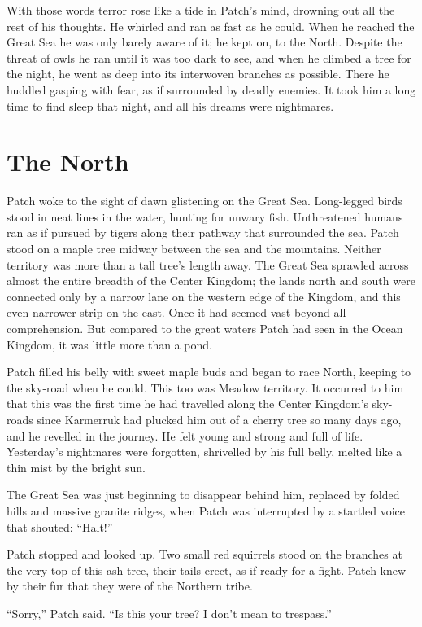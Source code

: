 \documentclass[ebook,oneside,openany,17pt]{memoir}
\newenvironment{tolerant}[1]{%
  \par\tolerance=#1\relax
}{%
  \par
}
\renewcommand{\thechapter}{\Roman{chapter}}
\newcounter{sections}
\newcommand{\sections}[1]{%
  \section*{#1}
  \addtocounter{sections}{1}%
  \pdfbookmark[1]{#1}{section.\thechapter.\thesections}}
\begin{document}
With those words terror rose like a tide in Patch’s mind, drowning out
all the rest of his thoughts. He whirled and ran as fast as he
could. When he reached the Great Sea he was only barely aware of it;
he kept on, to the North. Despite the threat of owls he ran until it
was too dark to see, and when he climbed a tree for the night, he went
as deep into its interwoven branches as possible. There he huddled
gasping with fear, as if surrounded by deadly enemies. It took him a
long time to find sleep that night, and all his dreams were
nightmares.


\sections{The North}

Patch woke to the sight of dawn glistening on the Great
Sea. Long-legged birds stood in neat lines in the water, hunting for
unwary fish. Unthreatened humans ran as if pursued by tigers along
their pathway that surrounded the sea. Patch stood on a maple tree
midway between the sea and the mountains. Neither territory was more
than a tall tree’s length away. The Great Sea sprawled across almost
the entire breadth of the Center Kingdom; the lands north and south
were connected only by a narrow lane on the western edge of the
Kingdom, and this even narrower strip on the east. Once it had seemed
vast beyond all comprehension. But compared to the great waters Patch
had seen in the Ocean Kingdom, it was little more than a pond.

\begin{tolerant}{500}
Patch filled his belly with sweet maple buds and began to race North,
keeping to the sky-road when he could. This too was Meadow
territory. It occurred to him that this was the first time he had
travelled along the Center Kingdom’s sky-roads since Karmerruk had
plucked him out of a cherry tree so many days ago, and he revelled in
the journey. He felt young and strong and full of life. Yesterday’s
nightmares were forgotten, shrivelled by his full belly, melted like a
thin mist by the bright sun.
\end{tolerant}

The Great Sea was just beginning to disappear behind him, replaced by
folded hills and massive granite ridges, when Patch was interrupted by
a startled voice that shouted: “Halt!”

Patch stopped and looked up. Two small red squirrels stood on the
branches at the very top of this ash tree, their tails erect, as if
ready for a fight. Patch knew by their fur that they were of the
Northern tribe.

“Sorry,” Patch said. “Is this your tree? I don’t mean to trespass.”
\end{document}
